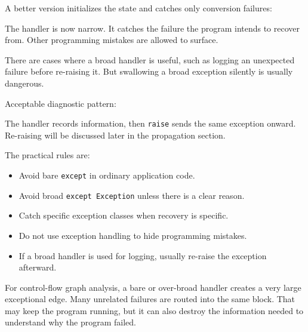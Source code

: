 A better version initializes the state and catches only conversion failures:

The handler is now narrow. It catches the failure the program intends to recover from. Other programming mistakes are allowed to surface.

There are cases where a broad handler is useful, such as logging an unexpected failure before re-raising it. But swallowing a broad exception silently is usually dangerous.

Acceptable diagnostic pattern:

The handler records information, then \texttt{raise} sends the same exception onward. Re-raising will be discussed later in the propagation section.

The practical rules are:

\begin{itemize}
    \item Avoid bare \texttt{except} in ordinary application code.
    \item Avoid broad \texttt{except Exception} unless there is a clear reason.
    \item Catch specific exception classes when recovery is specific.
    \item Do not use exception handling to hide programming mistakes.
    \item If a broad handler is used for logging, usually re-raise the exception afterward.
\end{itemize}

For control-flow graph analysis, a bare or over-broad handler creates a very large exceptional edge. Many unrelated failures are routed into the same block. That may keep the program running, but it can also destroy the information needed to understand why the program failed.